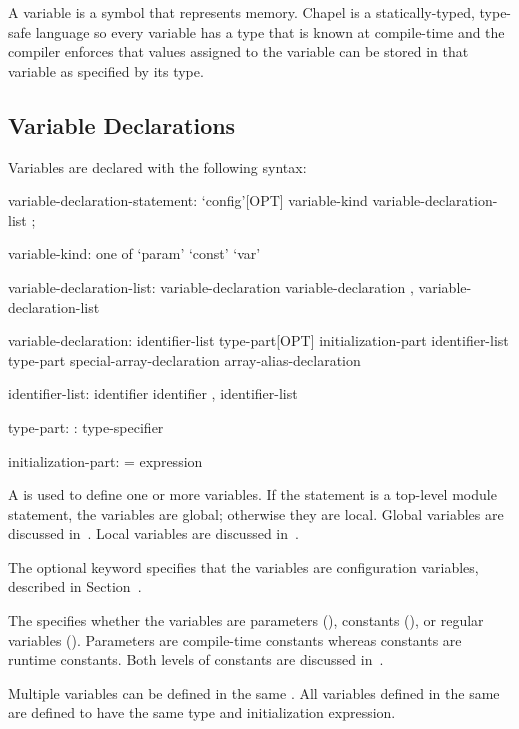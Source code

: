 \label{Variables}

A variable is a symbol that represents memory.  Chapel is a
statically-typed, type-safe language so every variable has a type that
is known at compile-time and the compiler enforces that values
assigned to the variable can be stored in that variable as specified
by its type.

\subsection{Variable Declarations}
\label{Variable_Declarations}

Variables are declared with the following syntax:
\begin{syntax}
variable-declaration-statement:
  `config'[OPT] variable-kind variable-declaration-list ;

variable-kind: one of
  `param' `const' `var'

variable-declaration-list:
  variable-declaration
  variable-declaration , variable-declaration-list

variable-declaration:
  identifier-list type-part[OPT] initialization-part
  identifier-list type-part
  special-array-declaration
  array-alias-declaration

identifier-list:
  identifier
  identifier , identifier-list

type-part:
  : type-specifier

initialization-part:
  = expression
\end{syntax}
A  is used to define one or more
variables.  If the statement is a top-level module statement, the
variables are global; otherwise they are local.  Global variables are
discussed in~.  Local variables are discussed
in~.

The optional keyword  specifies that the variables are
configuration variables, described in
Section~.

The  specifies whether the variables are
parameters (), constants (), or regular
variables ().  Parameters are compile-time constants whereas
constants are runtime constants.  Both levels of constants are
discussed in~.

Multiple variables can be defined in the same .
All variables defined in the same  are
defined to have the same type and initialization expression.

